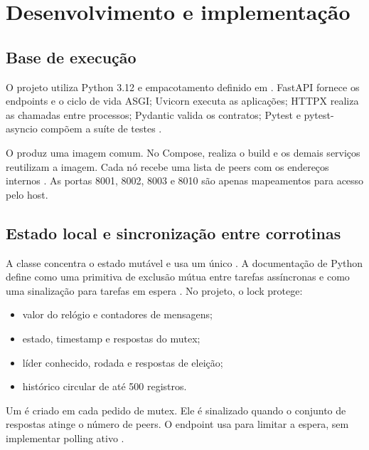 \section{Desenvolvimento e implementação}
\label{sec:desenvolvimento}

\subsection{Base de execução}

O projeto utiliza Python 3.12 e empacotamento definido em . FastAPI fornece os endpoints e o ciclo de vida ASGI; Uvicorn executa as aplicações; HTTPX realiza as chamadas entre processos; Pydantic valida os contratos; Pytest e pytest-asyncio compõem a suíte de testes \cite{fastapi,uvicorn,httpx,pydantic,pytest,pytestasyncio}.

O  \cite{dockerfile} produz uma imagem comum. No Compose,  realiza o build e os demais serviços reutilizam a imagem. Cada nó recebe uma lista de peers com os endereços internos . As portas 8001, 8002, 8003 e 8010 são apenas mapeamentos para acesso pelo host.

\subsection{Estado local e sincronização entre corrotinas}

A classe  concentra o estado mutável e usa um único . A documentação de Python define  como uma primitiva de exclusão mútua entre tarefas assíncronas e  como uma sinalização para tarefas em espera \cite{python-asyncio}. No projeto, o lock protege:

\begin{itemize}
    \item valor do relógio e contadores de mensagens;
    \item estado, timestamp e respostas do mutex;
    \item líder conhecido, rodada e respostas de eleição;
    \item histórico circular de até 500 registros.
\end{itemize}

Um  é criado em cada pedido de mutex. Ele é sinalizado quando o conjunto de respostas atinge o número de peers. O endpoint usa  para limitar a espera, sem implementar polling ativo \cite{python-waitfor}.

